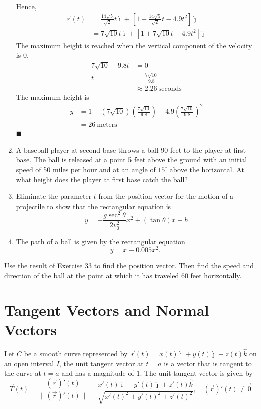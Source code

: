 \documentclass{report}
\begin{document}
\begin{enumerate}
          Hence,
          \begin{align*}
              \vec{r}(t) & = \frac{14\sqrt{5}}{\sqrt{2}} t\hat{\imath} + \left[1 + \frac{14\sqrt{5}}{\sqrt{2}} t - 4.9t^2\right]\hat{\jmath} \\
                         & = 7\sqrt{10} t\hat{\imath} + \left[1 + 7\sqrt{10} t - 4.9t^2\right]\hat{\jmath}
          \end{align*}
          The maximum height is reached when the vertical component of the velocity is $0$.
          \begin{align*}
              7\sqrt{10} - 9.8t & = 0                          \\
              t                 & = \frac{7\sqrt{10}}{9.8}     \\
                                & \approx 2.26\ \text{seconds}
          \end{align*}
          The maximum height is
          \begin{align*}
              y & = 1 + (7\sqrt{10})\left(\frac{7\sqrt{10}}{9.8}\right) - 4.9\left(\frac{7\sqrt{10}}{9.8}\right)^2 \\
                & = 26\ \text{meters}
          \end{align*} \hfill$\blacksquare$

    \item A baseball player at second base throws a ball 90 feet to the player at first
          base. The ball is released at a point 5 feet above the ground with an initial
          speed of 50 miles per hour and at an angle of $15^{\circ}$ above the
          horizontal. At what height does the player at first base catch the ball?
    \item Eliminate the parameter $t$ from the position vector for the motion of a
          projectile to show that the rectangular equation is $$ y=-\frac{g \sec ^2
                  \theta}{2 v_0^2} x^2+(\tan \theta) x+h $$
    \item The path of a ball is given by the rectangular equation $$ y=x-0.005 x^2 \text
              {. } $$
\end{enumerate}

Use the result of Exercise 33 to find the position vector. Then find the speed
and direction of the ball at the point at which it has traveled 60 feet
horizontally.

\newpage

\chapter {Tangent Vectors and Normal Vectors}

Let $C$ be a smooth curve represented by $\vec{r}(t) = x(t)\hat{\imath} +
    y(t)\hat{\jmath} + z(t)\hat{k}$ on an open interval $I$, the unit tangent
vector at $t = a$ is a vector that is tangent to the curve at $t = a$ and has a
magnitude of $1$. The unit tangent vector is given by \[\vec{T}(t) = \frac{(\vec{r})'(t)}{\lVert(\vec{r})'(t)\rVert} = \frac{x'(t)\hat{\imath} + y'(t)\hat{\jmath} + z'(t)\hat{k}}{\sqrt{x'(t)^2 + y'(t)^2 + z'(t)^2}}, \quad (\vec{r})'(t) \neq \vec{0}\]
\end{document}

